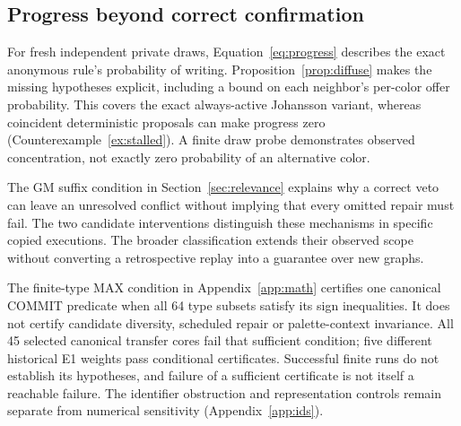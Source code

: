 \subsection{Progress beyond correct confirmation}\label{sec:interpretation}
For fresh independent private draws, Equation~\eqref{eq:progress} describes
the exact anonymous rule's probability of writing. Proposition~\ref{prop:diffuse}
makes the missing hypotheses explicit, including a bound on each neighbor's
per-color offer probability. This covers the exact always-active Johansson
variant, whereas coincident deterministic proposals can make progress zero
(Counterexample~\ref{ex:stalled}). A finite draw probe demonstrates observed
concentration, not exactly zero probability of an alternative color.

The GM suffix condition in Section~\ref{sec:relevance} explains why a correct
veto can leave an unresolved conflict without implying that every omitted
repair must fail. The two candidate interventions distinguish these
mechanisms in specific copied executions. The broader classification
extends their observed scope without converting a retrospective replay into
a guarantee over new graphs.

The finite-type MAX condition in Appendix~\ref{app:math} certifies one
canonical COMMIT predicate when all 64 type subsets satisfy its sign
inequalities. It does not certify candidate diversity, scheduled repair or
palette-context invariance. All 45 selected canonical transfer cores fail
that sufficient condition; five different historical E1 weights pass
conditional certificates. Successful finite runs do not establish its
hypotheses, and failure of a sufficient certificate is not itself a
reachable failure. The identifier obstruction and representation controls
remain separate from numerical sensitivity (Appendix~\ref{app:ids}).
